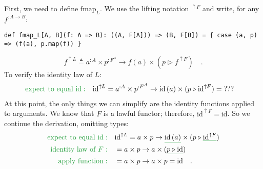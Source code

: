 First, we need to define $\text{fmap}_{L}$. We use the lifting notation
$^{\uparrow F}$ and write, for any $f^{:A\rightarrow B}$:
\begin{lstlisting}
def fmap_L[A, B](f: A => B): ((A, F[A])) => (B, F[B]) = { case (a, p) => (f(a), p.map(f)) }
\end{lstlisting}
\[
f^{\uparrow L}\triangleq a^{:A}\times p^{:F^{A}}\rightarrow f(a)\times(p\triangleright f^{\uparrow F})\quad.
\]
To verify the identity law of $L$:
\begin{align*}
{\color{greenunder}\text{expect to equal }\text{id}:}\quad & \text{id}^{\uparrow L}=a^{:A}\times p^{:F^{A}}\rightarrow\text{id}\,(a)\times(p\triangleright\text{id}^{\uparrow F})=\text{???}
\end{align*}
At this point, the only things we can simplify are the identity functions
applied to arguments. We know that $F$ is a lawful functor; therefore,
$\text{id}^{\uparrow F}=\text{id}$. So we continue the derivation,
omitting types:
\begin{align*}
{\color{greenunder}\text{expect to equal }\text{id}:}\quad & \text{id}^{\uparrow L}=a\times p\rightarrow\gunderline{\text{id}\,(a)}\times(p\triangleright\gunderline{\text{id}^{\uparrow F}})\\
{\color{greenunder}\text{identity law of }F:}\quad & =a\times p\rightarrow a\times(\gunderline{p\triangleright\text{id}})\\
{\color{greenunder}\text{apply function}:}\quad & =a\times p\rightarrow a\times p=\text{id}\quad.
\end{align*}

